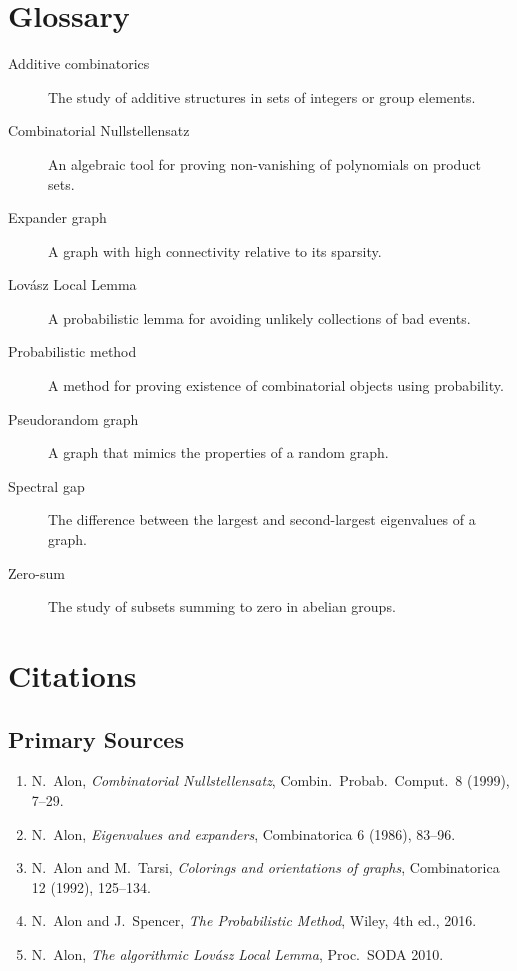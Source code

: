 \section*{Glossary}

\begin{description}
    \item[Additive combinatorics] The study of additive structures in sets of integers or group elements.
    \item[Combinatorial Nullstellensatz] An algebraic tool for proving non-vanishing of polynomials on product sets.
    \item[Expander graph] A graph with high connectivity relative to its sparsity.
    \item[Lov\'asz Local Lemma] A probabilistic lemma for avoiding unlikely collections of bad events.
    \item[Probabilistic method] A method for proving existence of combinatorial objects using probability.
    \item[Pseudorandom graph] A graph that mimics the properties of a random graph.
    \item[Spectral gap] The difference between the largest and second-largest eigenvalues of a graph.
    \item[Zero-sum] The study of subsets summing to zero in abelian groups.
\end{description}

\section{Citations}\subsection*{Primary Sources}
\begin{enumerate}
    \item N.\ Alon, \textit{Combinatorial Nullstellensatz}, Combin.\ Probab.\ Comput.\ 8 (1999), 7--29.
    \item N.\ Alon, \textit{Eigenvalues and expanders}, Combinatorica 6 (1986), 83--96.
    \item N.\ Alon and M.\ Tarsi, \textit{Colorings and orientations of graphs}, Combinatorica 12 (1992), 125--134.
    \item N.\ Alon and J.\ Spencer, \textit{The Probabilistic Method}, Wiley, 4th ed., 2016.
    \item N.\ Alon, \textit{The algorithmic Lov\'asz Local Lemma}, Proc.\ SODA 2010.
\end{enumerate}

